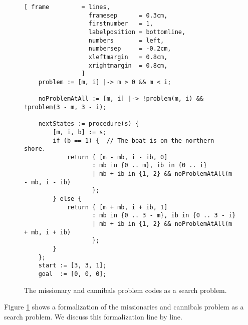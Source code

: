\begin{figure}[!ht]
\centering
\begin{Verbatim}[ frame         = lines, 
                  framesep      = 0.3cm, 
                  firstnumber   = 1,
                  labelposition = bottomline,
                  numbers       = left,
                  numbersep     = -0.2cm,
                  xleftmargin   = 0.8cm,
                  xrightmargin  = 0.8cm,
                ]
    problem := [m, i] |-> m > 0 && m < i;

    noProblemAtAll := [m, i] |-> !problem(m, i) && !problem(3 - m, 3 - i);

    nextStates := procedure(s) {
        [m, i, b] := s;
        if (b == 1) {  // The boat is on the northern shore.
            return { [m - mb, i - ib, 0]
                   : mb in {0 .. m}, ib in {0 .. i}           
                   | mb + ib in {1, 2} && noProblemAtAll(m - mb, i - ib)
                   };
        } else {
            return { [m + mb, i + ib, 1]
                   : mb in {0 .. 3 - m}, ib in {0 .. 3 - i}           
                   | mb + ib in {1, 2} && noProblemAtAll(m + mb, i + ib)
                   };
        }
    };
    start := [3, 3, 1];
    goal  := [0, 0, 0];
\end{Verbatim}
\vspace*{-0.3cm}
\caption{The missionary and cannibals problem codes as a search problem.}
\label{fig:missionaries.stlx}
\end{figure}
\noindent
Figure \ref{fig:missionaries.stlx} shows a formalization of the missionaries and cannibals problem
as a search problem.  We discuss this formalization line by line.
